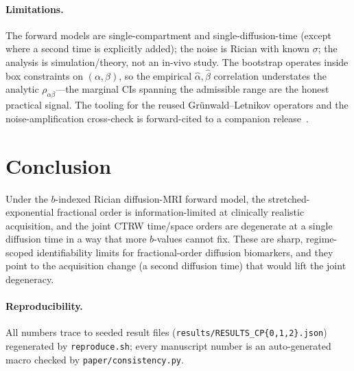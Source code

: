 \documentclass[11pt]{article}
\newcommand{\rhoab}{\rho_{\alpha\beta}}
\begin{document}
\paragraph{Limitations.} The forward models are single-compartment and single-diffusion-time
(except where a second time is explicitly added); the noise is Rician with known $\sigma$; the
analysis is simulation/theory, not an in-vivo study. The bootstrap operates inside box
constraints on $(\alpha,\beta)$, so the empirical $\hat\alpha,\hat\beta$ correlation
understates the analytic $\rhoab$---the marginal CIs spanning the admissible range are the
honest practical signal. The tooling for the reused Gr\"unwald--Letnikov operators and the
noise-amplification cross-check is forward-cited to a companion
release~\citep{ouroboros}. %

\section{Conclusion}
Under the $b$-indexed Rician diffusion-MRI forward model, the stretched-exponential fractional
order is information-limited at clinically realistic acquisition, and the joint CTRW time/space
orders are degenerate at a single diffusion time in a way that more $b$-values cannot fix. These
are sharp, regime-scoped identifiability limits for fractional-order diffusion biomarkers, and
they point to the acquisition change (a second diffusion time) that would lift the joint
degeneracy.

\paragraph{Reproducibility.} All numbers trace to seeded result files
(\texttt{results/RESULTS\_CP\{0,1,2\}.json}) regenerated by \texttt{reproduce.sh}; every
manuscript number is an auto-generated macro checked by \texttt{paper/consistency.py}.
\end{document}
